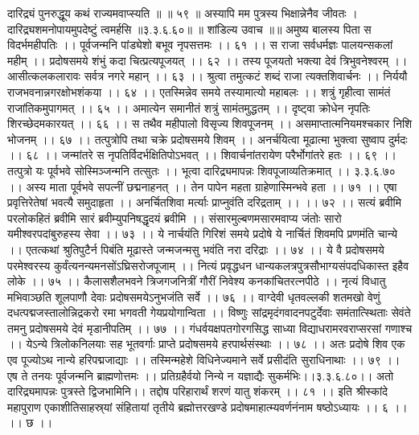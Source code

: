 दारिद्र्यं पुनरुद्धूय कथं राज्यमवाप्स्यति ॥ ॥ ५९ ॥
अस्यापि मम पुत्रस्य भिक्षान्नेनैव जीवतः ।
दारिद्र्यशमनोपायमुपदेष्टुं त्वमर्हसि ॥३.३.६.६०॥
॥ शांडिल्य उवाच ॥॥
अमुष्य बालस्य पिता स विदर्भमहीपतिः ।।
पूर्वजन्मनि पांड्येशो बभूव नृपसत्तमः ।। ६१ ।।
स राजा सर्वधर्मज्ञः पालयन्सकलां महीम् ।।
प्रदोषसमये शंभुं कदा चित्प्रत्यपूजयत् ।। ६२ ।।
तस्य पूजयतो भक्त्या देवं त्रिभुवनेश्वरम् ।।
आसीत्कलकलारावः सर्वत्र नगरे महान् ।। ६३ ।।
श्रुत्वा तमुत्कटं शब्दं राजा त्यक्तशिवार्चनः ।।
निर्ययौ राजभवनान्नगरक्षोभशंकया ।। ६४ ।।
एतस्मिन्नेव समये तस्यामात्यो महाबलः ।।
शत्रुं गृहीत्वा सामंतं राजांतिकमुपागमत् ।। ६५ ।।
अमात्येन समानीतं शत्रुं सामंतमुद्धतम् ।।
दृष्ट्वा क्रोधेन नृपतिः शिरच्छेदमकारयत् ।। ६६ ।।
स तथैव महीपालो विसृज्य शिवपूजनम् ।।
असमाप्तात्मनियमश्चकार निशि भोजनम् ।। ६७ ।।
तत्पुत्रोपि तथा चक्रे प्रदोषसमये शिवम् ।।
अनर्चयित्वा मूढात्मा भुक्त्वा सुष्वाप दुर्मदः ।। ६८ ।।
जन्मांतरे स नृपतिर्विदर्भक्षितिपोऽभवत् ।।
शिवार्चनांतरायेण परैर्भोगांतरे हतः ।। ६९ ।।
तत्पुत्रो यः पूर्वभवे सोस्मिञ्जन्मनि तत्सुतः ।।
भूत्वा दारिद्र्यमापन्नः शिवपूजाव्यतिक्रमात् ।। ३.३.६.७० ।।
अस्य माता पूर्वभवे सपत्नीं छद्मनाहनत् ।।
तेन पापेन महता ग्राहेणास्मिन्भवे हता ।। ७१ ।।
एषा प्रवृत्तिरेतेषां भवत्यै समुदाहृता ।।
अनर्चितशिवा मर्त्याः प्राप्नुवंति दरिद्रताम् ।। ।। ७२ ।।
सत्यं ब्रवीमि परलोकहितं ब्रवीमि सारं ब्रवीम्युपनिषद्धृदयं ब्रवीमि ।।
संसारमुल्बणमसारमवाप्य जंतोः सारो यमीश्वरपदांबुरुहस्य सेवा ।। ७३ ।।
ये नार्चयंति गिरिशं समये प्रदोषे ये नार्चितं शिवमपि प्रणमंति चान्ये ।।
एतत्कथां श्रुतिपुटैर्न पिबंति मूढास्ते जन्मजन्मसु भवंति नरा दरिद्राः ।। ७४ ।।
ये वै प्रदोषसमये परमेश्वरस्य कुर्वंत्यनन्यमनसोंऽघ्रिसरोजपूजाम् ।।
नित्यं प्रवृद्धधन धान्यकलत्रपुत्रसौभाग्यसंपदधिकास्त इहैव लोके ।। ७५ ।।
कैलासशैलभवने त्रिजगजनित्रीं गौरीं निवेश्य कनकांचितरत्नपीठे ।।
नृत्यं विधातु मभिवाञ्छति शूलपाणौ देवाः प्रदोषसमयेऽनुभजंति सर्वे ।। ७६ ।।
वाग्देवी धृतवल्लकी शतमखो वेणुं दधत्पद्मजस्तालोन्निद्रकरो रमा भगवती गेयप्रयोगान्विता ।।
विष्णुः सांद्रमृदंगवादनपटुर्देवाः समंतात्स्थिताः सेवंते तमनु प्रदोषसमये देवं मृडानीपतिम् ।। ७७ ।।
गंधर्वयक्षपतगोरगसिद्ध साध्या विद्याधरामरवराप्सरसां गणाश्च ।।
येऽन्ये त्रिलोकनिलयाः सह भूतवर्गाः प्राप्ते प्रदोषसमये हरपार्थसंस्थाः ।। ७८ ।।
अतः प्रदोषे शिव एक एव पूज्योऽथ नान्ये हरिपद्मजाद्याः ।।
तस्मिन्महेशे विधिनेज्यमाने सर्वे प्रसीदंति सुराधिनाथाः ।। ७९ ।।
एष ते तनयः पूर्वजन्मनि ब्राह्मणोत्तमः ।।
प्रतिग्रहैर्वयो निन्ये न यज्ञाद्यैः सुकर्मभिः।।३.३.६.८०।।
अतो दारिद्र्यमापन्नः पुत्रस्ते द्विजभामिनि।।
तद्दोष परिहारार्थं शरणं यातु शंकरम् ।। ८१ ।।
इति श्रीस्कांदे महापुराण एकाशीतिसाहस्र्यां संहितायां तृतीये ब्रह्मोत्तरखण्डे प्रदोषमाहात्म्यवर्णनंनाम षष्ठोऽध्यायः ।। ६ ।। ।। छ ।।

